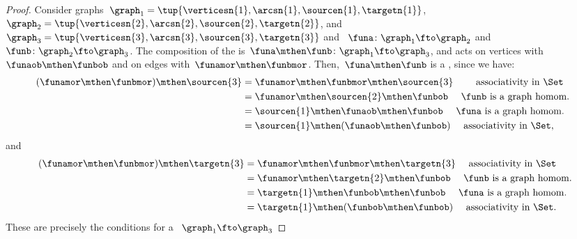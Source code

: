 \begin{proof}
    Consider graphs~$\graph_1=\tup{\verticesn{1},\arcsn{1},\sourcen{1},\targetn{1}}$,~$\graph_2=\tup{\verticesn{2},\arcsn{2},\sourcen{2},\targetn{2}}$, and~$\graph_3=\tup{\verticesn{3},\arcsn{3},\sourcen{3},\targetn{3}}$ and
    ~$\funa \colon \graph_1 \fto \graph_2$ and~$\funb \colon \graph_2 \fto \graph_3$.
    The composition of the  is~$\funa\mthen \funb \colon \graph_1 \fto \graph_3$, and acts on vertices with~$\funaob \mthen \funbob$ and on edges with~$\funamor \mthen \funbmor$.
    Then,~$\funa\mthen \funb$ is a , since  we have:
    \begin{equation}
        \begin{aligned}
            (\funamor\mthen \funbmor) \mthen \sourcen{3} & =\funamor\mthen \funbmor \mthen \sourcen{3} \qquad \text{ associativity in \Set} \\
                                                         & =\funamor\mthen \sourcen{2} \mthen \funbob \quad \text{ $\funb$ is a graph homom.
            } \\
                                                         & =\sourcen{1} \mthen \funaob\mthen \funbob \quad \text{ $\funa$ is a graph homom.} \\
                                                         & =\sourcen{1} \mthen (\funaob\mthen \funbob) \quad \text{ associativity in \Set},
        \end{aligned}
    \end{equation}
    and
    \begin{equation}
        \begin{aligned}
            (\funamor \mthen \funbmor) \mthen \targetn{3} & =\funamor \mthen \funbmor \mthen \targetn{3} \quad \text{ associativity in \Set} \\
                                                          & =\funamor \mthen \targetn{2}\mthen \funbob \quad \text{ $\funb$ is a graph homom.} \\
                                                          & =\targetn{1} \mthen \funbob\mthen \funbob \quad \text{ $\funa$ is a graph homom.} \\
                                                          & =\targetn{1} \mthen (\funbob\mthen \funbob)\quad \text{ associativity in \Set}.
        \end{aligned}
    \end{equation}
    These are precisely the conditions for a ~$\graph_1 \fto \graph_3$
\end{proof}
